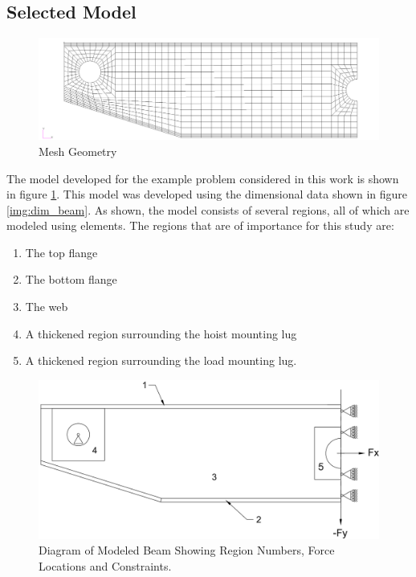 \subsection{Selected Model}
\label{sec:model}

\begin{figure}
\includegraphics[width=\textwidth]{img/mesh_geom.png}
\caption{Mesh Geometry}
\label{img:mesh_geom}
\end{figure}

The model developed for the example problem considered in this work is shown in figure \ref{img:mesh_geom}. This model was developed using the dimensional data shown in figure \ref{img:dim_beam}. As shown, the model consists of several regions, all of which are modeled using  elements. The regions that are of importance for this study are: 

\begin{enumerate}
  \item The top flange
  \item The bottom flange
  \item The web
  \item A thickened region surrounding the hoist mounting lug
  \item A thickened region surrounding the load mounting lug. 
\end{enumerate}

\begin{figure}
\includegraphics[width=\textwidth]{img/numbered_geom.png}
\caption[Diagram of Modeled Beam]{Diagram of Modeled Beam Showing Region Numbers, Force Locations and Constraints.}
\label{img:num_geom}
\end{figure}

